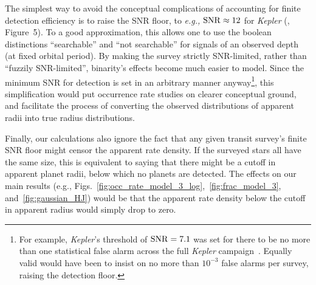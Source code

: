 \documentclass[12pt,modern]{aastex61}
\begin{document}
The simplest way to avoid the conceptual complications of accounting for 
finite detection efficiency is to raise the SNR floor, to {\it e.g.,} 
${\rm SNR} \approx 12$ for {\it Kepler} 
(\citealt{fulton_california-_2017}, Figure~5).
To a good approximation, this allows one to use the boolean distinctions 
``searchable'' and ``not searchable'' for signals of an observed depth (at 
fixed orbital period).
By making the survey strictly SNR-limited, rather than ``fuzzily 
SNR-limited'', binarity's effects become much easier to model.
Since the minimum SNR for detection is set in an arbitrary manner 
anyway\footnote{For example, {\it Kepler}'s threshold of ${\rm SNR}=7.1$ was 
set for there to be no more than one statistical false alarm across the full 
{\it Kepler} campaign~\citep{jenkins_tests_2002}. Equally valid would have 
been to insist on no more than $10^{-3}$ false alarms per survey, raising the 
detection floor.
}, this simplification would put occurrence rate studies on 
clearer conceptual 
ground, and facilitate the process of converting the observed distributions
of apparent radii into true radius distributions.

Finally, our calculations also ignore the fact that any given transit 
survey's finite SNR floor might censor the apparent rate density.
If the surveyed stars all have the same size, this is equivalent to 
saying that there might be a cutoff in apparent planet radii, below which no 
planets are detected.
The effects on our main results (e.g., 
Figs.~\ref{fig:occ_rate_model_3_log},~\ref{fig:frac_model_3}, 
and~\ref{fig:gaussian_HJ}) would be that the apparent rate density 
below the cutoff in apparent radius would simply drop to zero.

\end{document}
